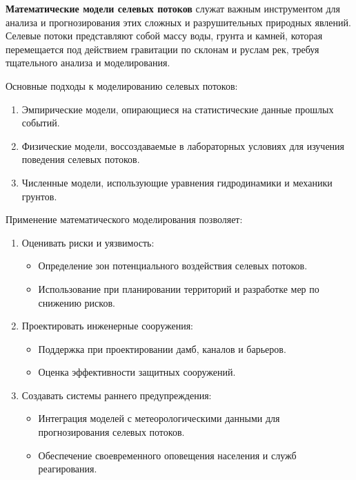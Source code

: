 {\bfseries Математические модели селевых потоков} служат важным
инструментом для анализа и прогнозирования этих сложных и разрушительных
природных явлений. Селевые потоки представляют собой массу воды, грунта
и камней, которая перемещается под действием гравитации по склонам и
руслам рек, требуя тщательного анализа и моделирования.

Основные подходы к моделированию селевых потоков:

\begin{enumerate}
\def\labelenumi{\arabic{enumi}.}
\item
  Эмпирические модели, опирающиеся на статистические данные прошлых
  событий.
\item
  Физические модели, воссоздаваемые в лабораторных условиях для изучения
  поведения селевых потоков.
\item
  Численные модели, использующие уравнения гидродинамики и механики
  грунтов.
\end{enumerate}

Применение математического моделирования позволяет:

\begin{enumerate}
\def\labelenumi{\arabic{enumi}.}
\item
  Оценивать риски и уязвимость:

  \begin{itemize}
  \item
    Определение зон потенциального воздействия селевых потоков.
  \item
    Использование при планировании территорий и разработке мер по
    снижению рисков.
  \end{itemize}
\item
  Проектировать инженерные сооружения:

  \begin{itemize}
  \item
    Поддержка при проектировании дамб, каналов и барьеров.
  \item
    Оценка эффективности защитных сооружений.
  \end{itemize}
\item
  Создавать системы раннего предупреждения:

  \begin{itemize}
  \item
    Интеграция моделей с метеорологическими данными для прогнозирования
    селевых потоков.
  \end{itemize}

  \begin{itemize}
  \item
    Обеспечение своевременного оповещения населения и служб
    реагирования.
  \end{itemize}
\end{enumerate}

